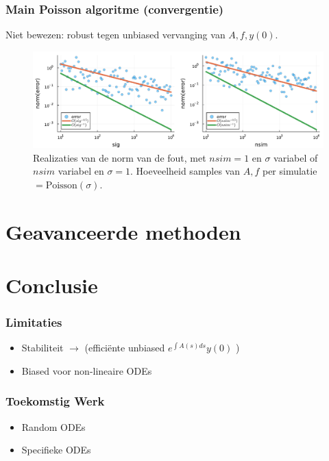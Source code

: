 \documentclass[18pt,aspectratio=149]{beamer}
\begin{document}
\begin{frame}
    \frametitle{Main Poisson algoritme (convergentie)}
    Niet bewezen: robust tegen unbiased vervanging van $A,f,y(0)$.
    \begin{figure}[h!]
        \centering
        \includegraphics[width=\textwidth]{imgs/convergence_main_poisson.pdf}
        \caption{Realizaties van de norm van de fout,
            met $nsim =1$ en $\sigma$ variabel of $nsim$ variabel en $\sigma = 1$.
            Hoeveelheid samples van $A,f$ per simulatie $= \text{Poisson}(\sigma)$.
        }
        \label{fig:imgs/main poisson convergentie}
    \end{figure}
\end{frame}

\section{Geavanceerde methoden}

\section{Conclusie}

\begin{frame}
    \frametitle{Limitaties}
    \begin{itemize}
        \item Stabiliteit $\rightarrow$ \cite{kettunen_unbiased_2021}
              (efficiënte unbiased $e^{\int A(s) ds } y(0)$ )
        \item Biased voor non-lineaire ODEs
    \end{itemize}
\end{frame}

\begin{frame}
    \frametitle{Toekomstig Werk}
    \begin{itemize}
        \item Random ODEs
        \item Specifieke ODEs
    \end{itemize}
\end{frame}

\end{document}
